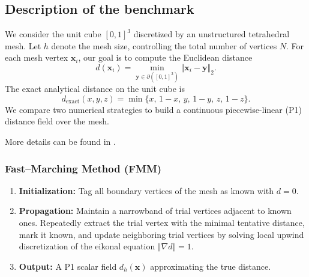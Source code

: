 

\subsection{Description of the benchmark}

We consider the unit cube $[0,1]^3$ discretized by an unstructured tetrahedral mesh.
Let $h$ denote the mesh size, controlling the total number of vertices $N$.
For each mesh vertex $\mathbf{x}_i$, our goal is to compute the Euclidean distance
\begin{equation}\label{eq:distance-definition}
  d(\mathbf{x}_i) = \min_{\mathbf{y}\in\partial([0,1]^3)} \Vert\mathbf{x}_i - \mathbf{y}\Vert_2.
\end{equation}
The exact analytical distance on the unit cube is
\begin{equation}\label{eq:distance-exact}
  d_{\mathrm{exact}}(x,y,z) = \min\{x,\,1-x,\,y,\,1-y,\,z,\,1-z\}.
\end{equation}
We compare two numerical strategies to build a continuous piecewise-linear (P1) distance field over the mesh.

More details can be found in \cite{van_landeghem_micro-swimming_2025}.


\subsubsection{Fast--Marching Method (FMM)}
\begin{enumerate}
  \item \textbf{Initialization:} Tag all boundary vertices of the mesh as known with $d=0$.
  \item \textbf{Propagation:} Maintain a narrowband of trial vertices adjacent to known ones. Repeatedly extract the trial vertex with the minimal tentative distance, mark it known, and update neighboring trial vertices by solving local upwind discretization of the eikonal equation $\Vert\nabla d\Vert = 1$.
  \item \textbf{Output:} A P1 scalar field $d_h(\mathbf{x})$ approximating the true distance.
\end{enumerate}

